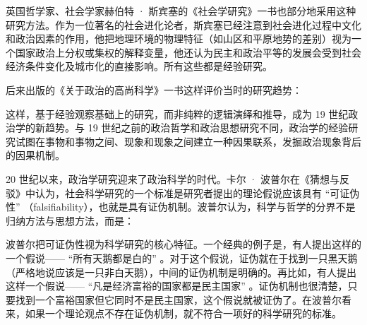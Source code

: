 英国哲学家、社会学家赫伯特 · 斯宾塞的《社会学研究》一书也部分地采用这种研究方法。作为一位著名的社会进化论者，斯宾塞已经注意到社会进化过程中文化和政治因素的作用，他把地理环境的物理特征（如山区和平原地势的差别）视为一个国家政治上分权或集权的解释变量，他还认为民主和政治平等的发展会受到社会经济条件变化及城市化的直接影响。所有这些都是经验研究。

后来出版的《关于政治的高尚科学》一书这样评价当时的研究趋势：


这样，基于经验观察基础上的研究，而非纯粹的逻辑演绎和推导，成为 19 世纪政治学的新趋势。与 19 世纪之前的政治哲学和政治思想研究不同，政治学的经验研究试图在事物和事物之间、现象和现象之间建立一种因果联系，发掘政治现象背后的因果机制。


20 世纪以来，政治学研究迎来了政治科学的时代。卡尔 · 波普尔在《猜想与反驳》中认为，社会科学研究的一个标准是研究者提出的理论假说应该具有 “可证伪性” （falsifiability），也就是具有证伪机制。波普尔认为，科学与哲学的分界不是归纳方法与思想方法，而是：


波普尔把可证伪性视为科学研究的核心特征。一个经典的例子是，有人提出这样的一个假说—— “所有天鹅都是白的” 。对于这个假说，证伪就在于找到一只黑天鹅（严格地说应该是一只非白天鹅），中间的证伪机制是明确的。再比如，有人提出这样一个假说—— “凡是经济富裕的国家都是民主国家” 。证伪机制也很清楚，只要找到一个富裕国家但它同时不是民主国家，这个假说就被证伪了。在波普尔看来，如果一个理论观点不存在证伪机制，就不符合一项好的科学研究的标准。

